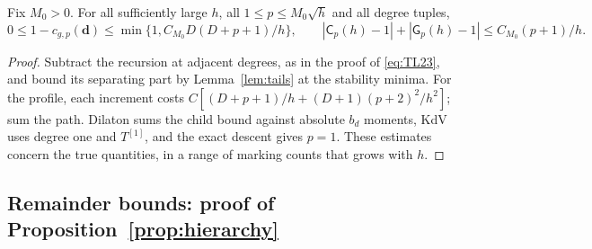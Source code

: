 \begin{lemma}\label{lem:first-order}
Fix $M_0>0$. For all sufficiently large $h$, all $1\le p\le M_0\sqrt h$
and all degree tuples,
\[
 0\le1-c_{g,p}(\mathbf d)
 \le\min\{1,C_{M_0}D(D+p+1)/h\},\qquad
 |\mathsf C_p(h)-1|+|\mathsf G_p(h)-1|\le C_{M_0}(p+1)/h.
\]
\end{lemma}

\begin{proof}
Subtract the recursion at adjacent degrees, as in the proof of
\eqref{eq:TL23}, and bound its separating part by Lemma~\ref{lem:tails} at
the stability minima. For the profile, each increment costs
$C[(D+p+1)/h+(D+1)(p+2)^2/h^2]$; sum the path.
Dilaton sums the child bound against absolute $b_d$ moments, KdV uses
degree one and $T^{[1]}$, and the exact descent gives $p=1$.
These estimates concern the true quantities, in a range of marking counts
that grows with $h$.
\end{proof}

\subsection{Remainder bounds: proof of Proposition~\ref{prop:hierarchy}}\label{app:remainder-bounds}

